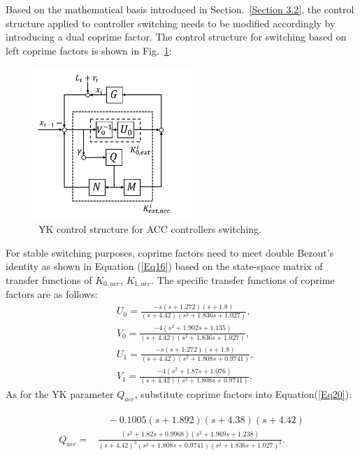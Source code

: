 \documentclass[trsc,nonblindrev]{informs3} %
\begin{document}
Based on the mathematical basis introduced in Section.~\ref{Section 3.2}, the control structure applied to controller switching needs to be modified accordingly by introducing a dual coprime factor. The control structure for switching based on left coprime factors is shown in Fig.~\ref{fig6}:

\begin{figure}
    \centering
    \includegraphics[width=6cm]{figs/fig6.png}
    \caption{~YK control structure for ACC controllers switching.}
    \label{fig6}
\end{figure}
For stable switching purposes, coprime factors need to meet double Bezout's identity as shown in Equation (\ref{Eq16}) based on the state-space matrix of transfer functions of $K_{0,acc}$, $K_{1,acc}$. The specific transfer functions of coprime factors are as follows:
\begin{equation}
    \begin{aligned}
         & U_{0}=\frac{-s(s+1.272)(s+1.8)}{(s+4.42)\left(s^{2}+1.836 s+1.027\right)},                 \\
         & V_{0}=\frac{-4\left(s^{2}+1.902 s+1.135\right)}{(s+4.42)\left(s^{2}+1.836 s+1.027\right)}, \\
         & U_{1}=\frac{-s(s+1.272)(s+1.8)}{(s+4.42)\left(s^{2}+1.808 s+0.9741\right)},                \\
         & V_{1}=\frac{-4\left(s^{2}+1.87 s+1.076\right)}{(s+4.42)\left(s^{2}+1.808 s+0.9741\right)}.
    \end{aligned}
\end{equation}
As for the YK parameter $Q_{acc}$, substitute coprime factors into Equation(\ref{Eq20}):

\begin{small}
    \begin{equation}
        \begin{gathered}
            \begin{aligned}
                           & \quad -0.1005(s+1.892)(s+4.38)(s+4.42)                                                                                                                      \\
                Q_{a c c}= & \frac{\left(s^{2}+1.82 s+0.9968\right)\left(s^{2}+1.969 s+1.238\right)}{(s+4.42)^{3}\left(s^{2}+1.808 s+0.9741\right)\left(s^{2}+1.836 s+1.027\right)^{2}}.
            \end{aligned}
        \end{gathered}
    \end{equation}
\end{small}
\end{document}
